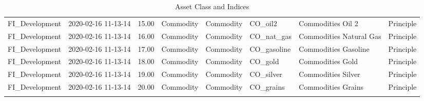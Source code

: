 \begin{longtable}{llrlllll}
  FI\_Development & 2020-02-16 11-13-14 & 15.00 & Commodity & Commodity & CO\_oil2 & Commodities Oil 2 & Principle \\ 
  FI\_Development & 2020-02-16 11-13-14 & 16.00 & Commodity & Commodity & CO\_nat\_gas & Commodities Natural Gas & Principle \\ 
  FI\_Development & 2020-02-16 11-13-14 & 17.00 & Commodity & Commodity & CO\_gasoline & Commodities Gasoline & Principle \\ 
  FI\_Development & 2020-02-16 11-13-14 & 18.00 & Commodity & Commodity & CO\_gold & Commodities Gold & Principle \\ 
  FI\_Development & 2020-02-16 11-13-14 & 19.00 & Commodity & Commodity & CO\_silver & Commodities Silver & Principle \\ 
  FI\_Development & 2020-02-16 11-13-14 & 20.00 & Commodity & Commodity & CO\_grains & Commodities Grains & Principle \\ 
   \hline
\hline
\caption{Asset Class and Indices} 
\end{longtable}
